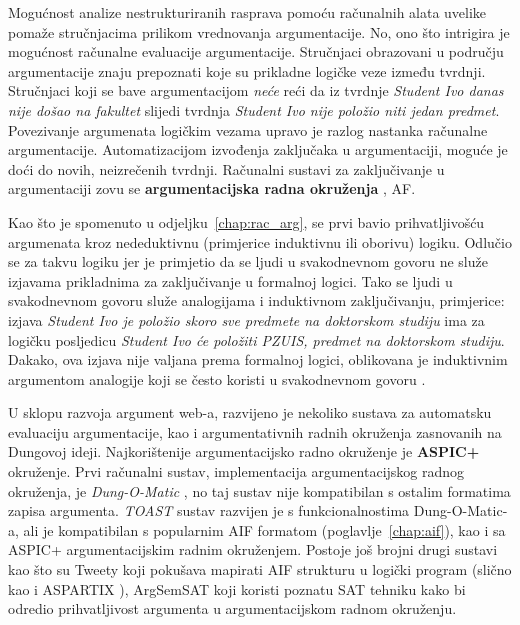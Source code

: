 Mogućnost analize nestrukturiranih rasprava pomoću
računalnih alata uvelike pomaže stručnjacima prilikom 
vrednovanja argumentacije. No, ono što intrigira je 
mogućnost računalne evaluacije argumentacije. 
Stručnjaci obrazovani u području argumentacije znaju prepoznati
koje su prikladne logičke veze između tvrdnji.   
Stručnjaci koji se bave argumentacijom \emph{neće} reći da iz tvrdnje
\emph{Student Ivo danas nije došao na fakultet} slijedi
tvrdnja \emph{Student Ivo nije položio niti jedan predmet}.
Povezivanje argumenata logičkim vezama upravo je
razlog nastanka računalne argumentacije. 
Automatizacijom izvođenja zaključaka u argumentaciji,
moguće je doći do novih, neizrečenih tvrdnji.
Računalni sustavi za zaključivanje u argumentaciji zovu se 
\textbf{argumentacijska radna okruženja} , \@{AF}.

Kao što je spomenuto u odjeljku~\ref{chap:rac_arg},
\cite{dung1995acceptability} se prvi bavio 
prihvatljivošću argumenata  
kroz nededuktivnu (primjerice induktivnu ili oborivu) logiku.
Odlučio se za takvu logiku jer je primjetio da se ljudi u svakodnevnom 
govoru ne služe izjavama prikladnima za zaključivanje u formalnoj logici. 
Tako se ljudi u svakodnevnom govoru služe analogijama i induktivnom zaključivanju, 
primjerice: izjava \emph{Student Ivo je položio skoro sve predmete na doktorskom studiju} 
ima za logičku posljedicu \emph{Student Ivo će položiti PZUIS, predmet na doktorskom studiju}. 
Dakako, ova izjava nije valjana prema formalnoj logici, oblikovana je
induktivnim argumentom analogije koji se često koristi u svakodnevnom govoru 
\citep{juthe2005argument}.

U sklopu razvoja argument web-a, razvijeno je nekoliko sustava za
automatsku evaluaciju argumentacije, kao i argumentativnih radnih okruženja
zasnovanih na Dungovoj ideji. Najkorištenije argumentacijsko radno okruženje
je \textbf{ASPIC+} okruženje. 
Prvi računalni sustav, implementacija argumentacijskog radnog okruženja, 
je \emph{Dung-O-Matic} \citep{snaith2010pipelining},
no taj sustav nije kompatibilan s ostalim formatima zapisa argumenta. 
\emph{TOAST} sustav razvijen je s funkcionalnostima Dung-O-Matic-a, ali 
je kompatibilan s popularnim AIF formatom (poglavlje~\ref{chap:aif}), kao i sa 
ASPIC+ argumentacijskim radnim okruženjem. 
Postoje još brojni drugi sustavi kao što su Tweety \citep{thimm2014tweety} koji
pokušava mapirati AIF strukturu u logički program 
(slično kao i ASPARTIX \citep{egly2008aspartix}),
ArgSemSAT \citep{cerutti2014argsemsat}
koji koristi poznatu SAT \citep{moskewicz2001chaff}
 tehniku kako bi odredio prihvatljivost argumenta
u argumentacijskom radnom okruženju.

